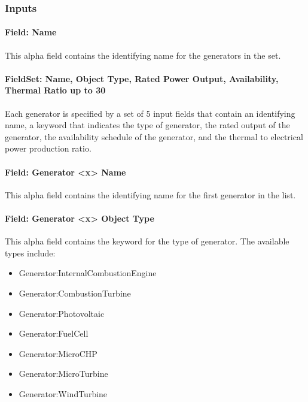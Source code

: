 \subsubsection{Inputs}\label{inputs-2-011}

\paragraph{Field: Name}\label{field-name-1-011}

This alpha field contains the identifying name for the generators in the set.

\paragraph{FieldSet: Name, Object Type, Rated Power Output, Availability, Thermal Ratio up to 30}\label{fieldset-name-object-type-rated-power-output-availability-thermal-ratio-up-to-30}

Each generator is specified by a set of 5 input fields that contain an identifying name, a keyword that indicates the type of generator, the rated output of the generator, the availability schedule of the generator, and the thermal to electrical power production ratio.

\paragraph{Field: Generator \textless{}x\textgreater{} Name}\label{field-generator-x-name}

This alpha field contains the identifying name for the first generator in the list.

\paragraph{Field: Generator \textless{}x\textgreater{} Object Type}\label{field-generator-x-object-type}

This alpha field contains the keyword for the type of generator. The available types include:

\begin{itemize}
\item
  Generator:InternalCombustionEngine
\item
  Generator:CombustionTurbine
\item
  Generator:Photovoltaic
\item
  Generator:FuelCell
\item
  Generator:MicroCHP
\item
  Generator:MicroTurbine
\item
  Generator:WindTurbine
\end{itemize}


